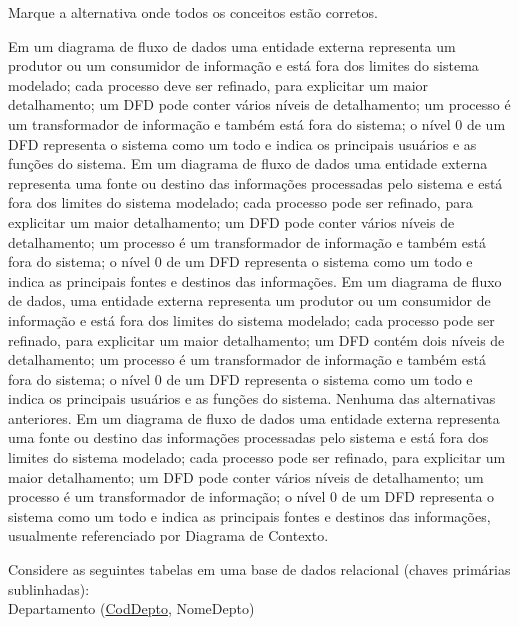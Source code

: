 \documentclass[12pt, addpoints]{exam}
\begin{document}
\begin{questions}
\question

Marque a alternativa onde todos os conceitos estão corretos.


\begin{choices}
\choice Em um diagrama de fluxo de dados uma entidade externa representa um produtor ou um consumidor de informação e está fora dos limites do sistema modelado; cada processo deve ser refinado, para explicitar um maior detalhamento; um DFD pode conter vários níveis de detalhamento; um processo é um transformador de informação e também está fora do sistema; o nível 0 de um DFD representa o sistema como um todo e indica os principais usuários e as funções do sistema.
\choice Em um diagrama de fluxo de dados uma entidade externa representa uma fonte ou destino das informações processadas pelo sistema e está fora dos limites do sistema modelado; cada processo pode ser refinado, para explicitar um maior detalhamento; um DFD pode conter vários níveis de detalhamento; um processo é um transformador de informação e também está fora do sistema; o nível 0 de um DFD representa o sistema como um todo e indica as principais fontes e destinos das informações.
\choice Em um diagrama de fluxo de dados, uma entidade externa representa um produtor ou um consumidor de informação e está fora dos limites do sistema modelado; cada processo pode ser refinado, para explicitar um maior detalhamento; um DFD contém dois níveis de detalhamento; um processo é um transformador de informação e também está fora do sistema; o nível 0 de um DFD representa o sistema como um todo e indica os principais usuários e as funções do sistema.
\choice Nenhuma das alternativas anteriores.
\choice Em um diagrama de fluxo de dados uma entidade externa representa uma fonte ou destino das informações processadas pelo sistema e está fora dos limites do sistema modelado; cada processo pode ser refinado, para explicitar um maior detalhamento; um DFD pode conter vários níveis de detalhamento; um processo é um transformador de informação; o nível 0 de um DFD representa o sistema como um todo e indica as principais fontes e destinos das informações, usualmente referenciado por Diagrama de Contexto.
\end{choices}

\question

Considere as seguintes tabelas em uma base de dados relacional (chaves primárias sublinhadas):\\

Departamento (\underline{CodDepto}, NomeDepto)\\


\end{questions}
\end{document}

